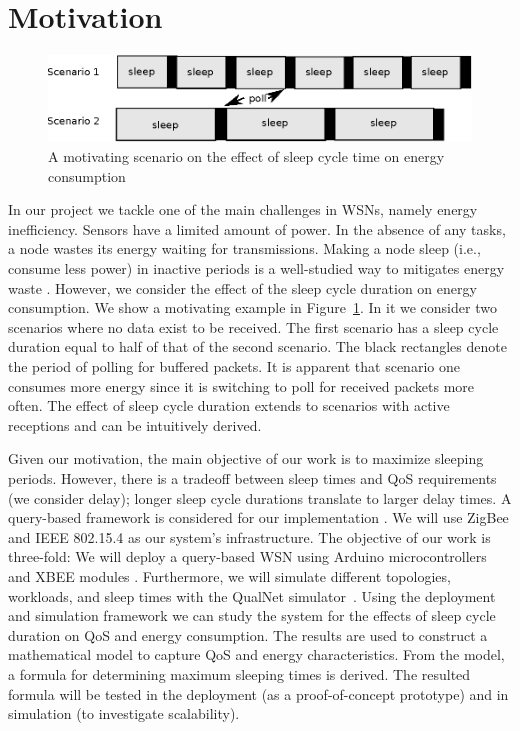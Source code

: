 \section{Motivation} \label{sec:motivation}


\begin{figure}[t]
\centering
\includegraphics[scale=0.65]{figures/drawing.eps}
\caption{A motivating scenario on the effect of sleep cycle time on energy consumption}
\label{fig:motivating}
\end{figure}

In our project we tackle one of the main challenges in WSNs, namely energy inefficiency. Sensors have a limited amount of power. In the absence of any tasks, a node wastes its energy waiting for transmissions. Making a node sleep (i.e., consume less power) in inactive periods is a well-studied way to mitigates energy waste \cite{1}. However, we consider the effect of the sleep cycle duration on energy consumption. We show a motivating example in Figure~\ref{fig:motivating}. In it we consider two scenarios where no data exist to be received. The first scenario has a sleep cycle duration equal to half of that of the second scenario. The black rectangles denote the period of polling for buffered packets. It is apparent that scenario one consumes more energy since it is switching to poll for received packets more often. The effect of sleep cycle duration extends to scenarios with active receptions and can be intuitively derived.  

Given our motivation, the main objective of our work is to maximize sleeping periods. However, there is a tradeoff between sleep times and QoS requirements (we consider delay); longer sleep cycle durations translate to larger delay times. A query-based framework is considered for our implementation \cite{2}. We will use ZigBee and IEEE 802.15.4 \cite{3} as our system's infrastructure. The objective of our work is three-fold: We will deploy a query-based WSN using Arduino microcontrollers \cite{17} and XBEE modules \cite{18}. Furthermore, we will simulate different topologies, workloads, and sleep times with the QualNet simulator~\cite{16}. Using the deployment and simulation framework we can study the system for the effects of sleep cycle duration on QoS and energy consumption. The results are used to construct a mathematical model to capture QoS and energy characteristics. From the model, a formula for determining maximum sleeping times is derived. The resulted formula will be tested in the deployment (as a proof-of-concept prototype) and in simulation (to investigate scalability).

